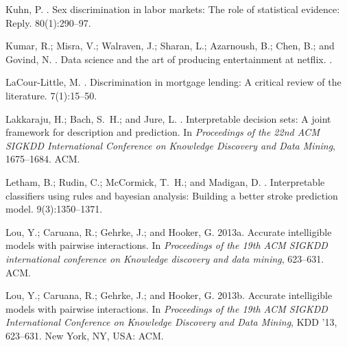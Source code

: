 \documentclass[letterpaper]{article} %
\theoremstyle{definition}
\newcommand{\1}{\ensuremath{{\rm e}}} %
\begin{document}
\begin{thebibliography}{}
	Kuhn, P.
	.
	\newblock Sex discrimination in labor markets: The role of statistical
	evidence: Reply.
	 80(1):290--97.
	
	Kumar, R.; Misra, V.; Walraven, J.; Sharan, L.; Azarnoush, B.; Chen, B.; and
	Govind, N.
	.
	\newblock Data science and the art of producing entertainment at netflix.
	.
	
	LaCour-Little, M.
	.
	\newblock Discrimination in mortgage lending: A critical review of the
	literature.
	 7(1):15--50.
	
	Lakkaraju, H.; Bach, S.~H.; and Jure, L.
	.
	\newblock Interpretable decision sets: A joint framework for description and
	prediction.
	\newblock In {\em Proceedings of the 22nd ACM SIGKDD International Conference
		on Knowledge Discovery and Data Mining},  1675--1684.
	\newblock ACM.
	
	Letham, B.; Rudin, C.; McCormick, T.~H.; and Madigan, D.
	.
	\newblock Interpretable classifiers using rules and bayesian analysis: Building
	a better stroke prediction model.
	 9(3):1350--1371.
	
	Lou, Y.; Caruana, R.; Gehrke, J.; and Hooker, G.
	\newblock 2013a.
	\newblock Accurate intelligible models with pairwise interactions.
	\newblock In {\em Proceedings of the 19th ACM SIGKDD international conference
		on Knowledge discovery and data mining},  623--631.
	\newblock ACM.
	
	Lou, Y.; Caruana, R.; Gehrke, J.; and Hooker, G.
	\newblock 2013b.
	\newblock Accurate intelligible models with pairwise interactions.
	\newblock In {\em Proceedings of the 19th ACM SIGKDD International Conference
		on Knowledge Discovery and Data Mining}, KDD '13,  623--631.
	\newblock New York, NY, USA: ACM.
	

\end{thebibliography}
\end{document}
